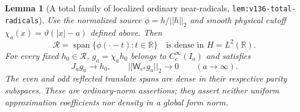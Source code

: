 \documentclass[11pt]{article}
\def\norm#1{||#1||}%
\newtheorem{lemma}[theorem]{Lemma}
\theoremstyle{remark}
\newcommand{\norm}[1]{\left\lVert #1\right\rVert}
\begin{document}
\begin{lemma}[A total family of localized ordinary near-radicals, \texttt{lem:v136-total-radicals}]
\label{lem:v136-total-radicals}
Use the normalized source $\phi = h/\norm{h}_2$ and smooth physical cutoff $\chi_a(x) = \vartheta(|x|-a)$ defined above. Then
\[
  \mathcal{R} = \operatorname{span}\{\phi(\cdot - t) : t \in \mathbb{R}\} \quad \text{is dense in } H = L^2(\mathbb{R}).
\]
For every fixed $h_0 \in \mathcal{R}$, $g_a = \chi_a h_0$ belongs to $C_c^\infty(I_a)$ and satisfies
\begin{equation}\label{eq:v136-dense-residual}
  J_a g_a \longrightarrow h_0, \qquad \norm{\mathsf{W}_{e^a} g_a}_2 \longrightarrow 0 \qquad (a \to \infty).
\end{equation}
The even and odd reflected translate spans are dense in their respective parity subspaces. These are ordinary-norm assertions; they assert neither uniform approximation coefficients nor density in a global form norm.
\end{lemma}
\end{document}
